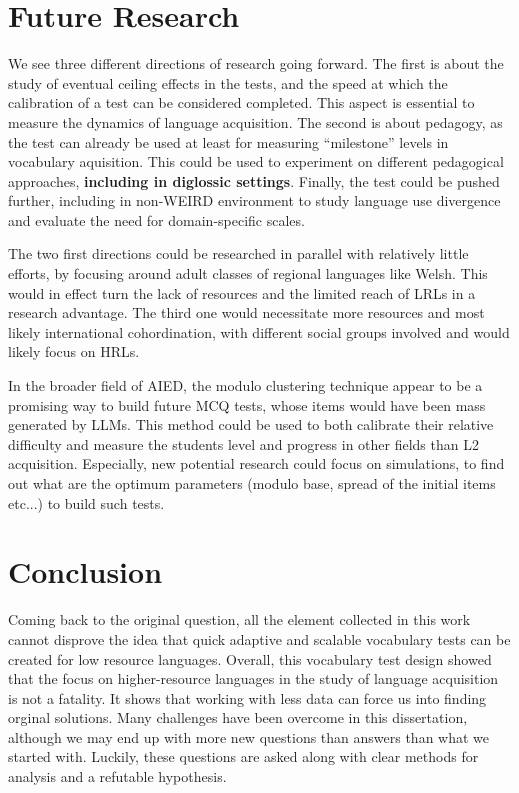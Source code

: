 \section{Future Research}
We see three different directions of research going forward. The first is about the study of eventual ceiling effects in the tests, and the speed at which the calibration of a test can be considered completed. This aspect is essential to measure the dynamics of language acquisition. The second is about pedagogy, as the test can already be used at least for measuring ``milestone'' levels in vocabulary aquisition. This could be used to experiment on different pedagogical approaches, \textbf{including in diglossic settings}. Finally, the test could be pushed further, including in non-WEIRD environment to study language use divergence and evaluate the need for domain-specific scales.

The two first directions could be researched in parallel with relatively little efforts, by focusing around adult classes of regional languages like Welsh. This would in effect turn the lack of resources and the limited reach of LRLs in a research advantage. The third one would necessitate more resources and most likely international cohordination, with different social groups involved and would likely focus on HRLs.

In the broader field of AIED, the modulo clustering technique appear to be a promising way to build future MCQ tests, whose items would have been mass generated by LLMs. This method could be used to both calibrate their relative difficulty and measure the students level and progress in other fields than L2 acquisition. Especially, new potential research could focus on simulations, to find out what are the optimum parameters (modulo base, spread of the initial items etc...) to build such tests.

\section{Conclusion}
Coming back to the original question, all the element collected in this work cannot disprove the idea that quick adaptive and scalable vocabulary tests can be created for low resource languages. Overall, this vocabulary test design showed that the focus on higher-resource languages in the study of language acquisition is not a fatality. It shows that working with less data can force us into finding orginal solutions. Many challenges have been overcome in this dissertation, although we may end up with more new questions than answers than what we started with. Luckily, these questions are asked along with clear methods for analysis and a refutable hypothesis.

